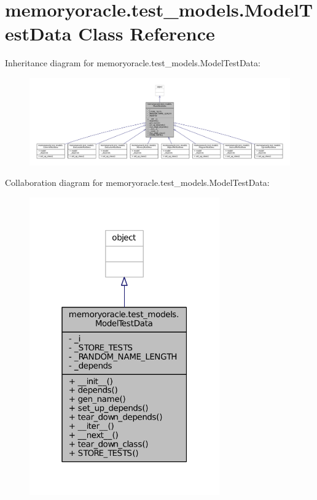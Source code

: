 \hypertarget{classmemoryoracle_1_1test__models_1_1ModelTestData}{}\section{memoryoracle.\+test\+\_\+models.\+Model\+Test\+Data Class Reference}
\label{classmemoryoracle_1_1test__models_1_1ModelTestData}


Inheritance diagram for memoryoracle.\+test\+\_\+models.\+Model\+Test\+Data\+:\nopagebreak
\begin{figure}[H]
\begin{center}
\leavevmode
\includegraphics[width=350pt]{classmemoryoracle_1_1test__models_1_1ModelTestData__inherit__graph}
\end{center}
\end{figure}


Collaboration diagram for memoryoracle.\+test\+\_\+models.\+Model\+Test\+Data\+:\nopagebreak
\begin{figure}[H]
\begin{center}
\leavevmode
\includegraphics[width=232pt]{classmemoryoracle_1_1test__models_1_1ModelTestData__coll__graph}
\end{center}
\end{figure}
